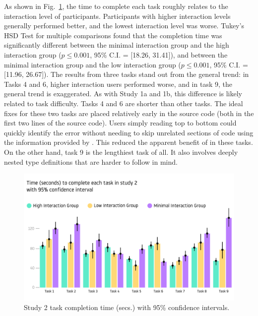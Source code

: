 As shown in  Fig.~\ref{fig:r4-analysis}, the time to complete each task roughly relates to the interaction level of participants. Participants with higher interaction levels generally performed better, and the lowest interaction level was worse. Tukey’s HSD Test for multiple comparisons found that the completion time was significantly different between the minimal interaction group and the high interaction group ($p \le 0.001$, 95\% C.I. = [18.26, 31.41]), and between the minimal interaction group and the low interaction group ($p \le 0.001$, 95\% C.I. = [11.96, 26.67]). The results from three tasks stand out from the general trend: in Tasks 4 and 6, higher interaction users performed worse, and in task 9, the general trend is exaggerated. As with Study 1a and 1b, this difference is likely related to task difficulty. Tasks 4 and 6 are shorter than other tasks. The ideal fixes for these two tasks are placed relatively early in the source code (both in the first two lines of the source code). Users simply reading top to bottom could quickly identify the error without needing to skip unrelated sections of code using the information provided by \chameleon{}. This reduced the apparent benefit of \chameleon{} in these tasks. On the other hand, task 9 is the lengthiest task of all. It also involves deeply nested type definitions that are harder to follow in mind.

\begin{figure}
    \centering
    \includegraphics[width=\linewidth,trim=0mm 15mm 0mm 50mm,clip]{images/user-study-2.pdf}
    \caption{Study 2 task completion time (secs.) with 95\% confidence intervals.}
    \label{fig:r4-analysis}
\end{figure}


